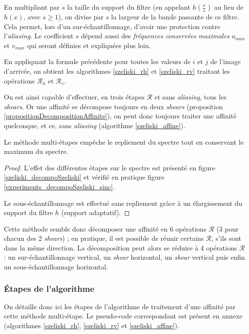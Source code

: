 	En multipliant par $s$ la taille du support du filtre (en appelant $h(\frac{x}{s})$ au lieu de $h(x)$, avec $s\geq 1$), on divise par $s$ la largeur de la bande passante de ce filtre. Cela permet, lors d'un sur-échantillonnage, d'avoir une protection contre l'\emph{aliasing}. Le coefficient $s$ dépend aussi des \emph{fréquences conservées maximales} $u_{max}$ et $v_{max}$ qui seront définies et expliquées plus loin.
	
	En appliquant la formule précédente pour toutes les valeurs de $i$ et $j$ de l'image d'arrivée, on obtient les algorithmes \ref{szeliski_rh} et \ref{szeliski_rv} traitant les opérations $\mathcal R_h$ et $\mathcal R_v$. \label{szeliski_rv_rh_section}
	
	On est ainsi capable d'effectuer, en trois étapes $\mathcal R$ et sans \emph{aliasing}, tous les \emph{shears}. Or une affinité se décompose toujours en deux \emph{shears} (proposition \ref{propositionDecompositionAffinite}), on peut donc toujours traiter une affinité quelconque, et ce, sans \emph{aliasing} (algorithme \ref{szeliski_affine}).

	\begin{thm}
	Le méthode multi-étapes \cite{szeliski2010high} empêche le repliement du spectre tout en conservant le maximum du spectre.
	\end{thm}
	\begin{proof}
	L'effet des différentes étapes sur le spectre est présenté en figure \ref{szeliski_decompoSzeliski} et vérifié en pratique figure \ref{experiments_decompoSzeliski_sinc}.
	
	Le sous-échantillonnage est effectué sans repliement grâce à un élargissement du support du filtre $h$ (support adaptatif).
	\end{proof}
	
	Cette méthode semble donc décomposer une affinité en 6 opérations $\mathcal R$ (3 pour chacun des 2 \emph{shears}) ; en pratique, il est possible de réunir certains $\mathcal R$, s'ils sont dans la même direction. La décomposition peut alors se réduire à 4 opérations $\mathcal R$ : un sur-échantillonnage vertical, un \emph{shear} horizontal, un \emph{shear} vertical puis enfin un sous-échantillonnage horizontal.
	
\subsubsection{Étapes de l'algorithme}
	\label{szeliski_affine_section}
	On détaille donc ici les étapes de l'algorithme de traitement d'une affinité par cette méthode multi-étape. Le pseudo-code correspondant est présent en annexe (algorithmes \ref{szeliski_rh}, \ref{szeliski_rv} et \ref{szeliski_affine}).
	
